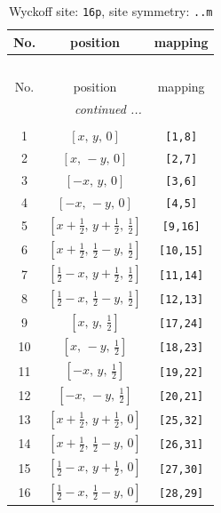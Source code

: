 \documentclass[fleqn,8pt]{jsarticle}
\begin{document}
\renewcommand{\arraystretch}{1.2}
\begin{longtable}{ccc}
\caption{Wyckoff site: {\tt 16p}, site symmetry: {\tt ..m}}
 \\
 \hline \hline
No. & position & mapping \\ \hline \endfirsthead

\multicolumn{2}{l}{\tablename\ \thetable{}} \\
 \hline \hline
No. & position & mapping \\ \hline \endhead

 \hline \hline
\multicolumn{2}{r}{\footnotesize\it continued ...} \\ \endfoot

 \hline \hline
\multicolumn{2}{r}{} \\ \endlastfoot

1 & $\left[ x,\, y,\, 0 \right]$ & {\tt [1,8]} \\ \hline
2 & $\left[ x,\, - y,\, 0 \right]$ & {\tt [2,7]} \\ \hline
3 & $\left[ - x,\, y,\, 0 \right]$ & {\tt [3,6]} \\ \hline
4 & $\left[ - x,\, - y,\, 0 \right]$ & {\tt [4,5]} \\ \hline
5 & $\left[ x + \frac{1}{2},\, y + \frac{1}{2},\, \frac{1}{2} \right]$ & {\tt [9,16]} \\ \hline
6 & $\left[ x + \frac{1}{2},\, \frac{1}{2} - y,\, \frac{1}{2} \right]$ & {\tt [10,15]} \\ \hline
7 & $\left[ \frac{1}{2} - x,\, y + \frac{1}{2},\, \frac{1}{2} \right]$ & {\tt [11,14]} \\ \hline
8 & $\left[ \frac{1}{2} - x,\, \frac{1}{2} - y,\, \frac{1}{2} \right]$ & {\tt [12,13]} \\ \hline
9 & $\left[ x,\, y,\, \frac{1}{2} \right]$ & {\tt [17,24]} \\ \hline
10 & $\left[ x,\, - y,\, \frac{1}{2} \right]$ & {\tt [18,23]} \\ \hline
11 & $\left[ - x,\, y,\, \frac{1}{2} \right]$ & {\tt [19,22]} \\ \hline
12 & $\left[ - x,\, - y,\, \frac{1}{2} \right]$ & {\tt [20,21]} \\ \hline
13 & $\left[ x + \frac{1}{2},\, y + \frac{1}{2},\, 0 \right]$ & {\tt [25,32]} \\ \hline
14 & $\left[ x + \frac{1}{2},\, \frac{1}{2} - y,\, 0 \right]$ & {\tt [26,31]} \\ \hline
15 & $\left[ \frac{1}{2} - x,\, y + \frac{1}{2},\, 0 \right]$ & {\tt [27,30]} \\ \hline
16 & $\left[ \frac{1}{2} - x,\, \frac{1}{2} - y,\, 0 \right]$ & {\tt [28,29]} \\
\end{longtable}
\end{document}
